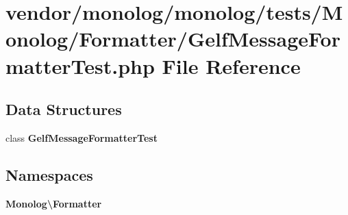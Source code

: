\section{vendor/monolog/monolog/tests/\+Monolog/\+Formatter/\+Gelf\+Message\+Formatter\+Test.php File Reference}
\label{_gelf_message_formatter_test_8php}
\subsection*{Data Structures}
\begin{DoxyCompactItemize}
\item 
class {\bf Gelf\+Message\+Formatter\+Test}
\end{DoxyCompactItemize}
\subsection*{Namespaces}
\begin{DoxyCompactItemize}
\item 
 {\bf Monolog\textbackslash{}\+Formatter}
\end{DoxyCompactItemize}
